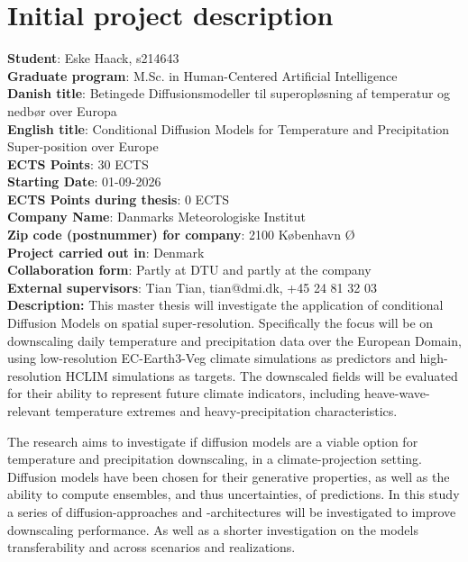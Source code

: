 \section*{Initial project description}

\textbf{Student}: Eske Haack, s214643 \\
\textbf{Graduate program}: M.Sc. in Human-Centered Artificial Intelligence \\
\textbf{Danish title}: Betingede Diffusionsmodeller til superopløsning af temperatur og nedbør over Europa \\
\textbf{English title}: Conditional Diffusion Models for Temperature and Precipitation Super-position over Europe \\
\textbf{ECTS Points}: 30 ECTS \\
\textbf{Starting Date}: 01-09-2026 \\
\textbf{ECTS Points during thesis}: 0 ECTS \\
\textbf{Company Name}: Danmarks Meteorologiske Institut \\
\textbf{Zip code (postnummer) for company}: 2100 København Ø \\
\textbf{Project carried out in}: Denmark \\
\textbf{Collaboration form}: Partly at DTU and partly at the company \\
\textbf{External supervisors}: Tian Tian, tian@dmi.dk, +45 24 81 32 03 \\
\textbf{Description: } This master thesis will investigate the application of conditional Diffusion Models on spatial super-resolution. Specifically the focus will be on downscaling daily temperature and precipitation data over the European Domain, using low-resolution EC-Earth3-Veg climate simulations as predictors and high-resolution HCLIM simulations as targets. The downscaled fields will be evaluated for their ability to represent future climate indicators, including heave-wave-relevant temperature extremes and heavy-precipitation characteristics.

The research aims to investigate if diffusion models are a viable option for temperature and precipitation downscaling, in a climate-projection setting. Diffusion models have been chosen for their generative properties, as well as the ability to compute ensembles, and thus uncertainties, of predictions.
In this study a series of diffusion-approaches and -architectures will be investigated to improve downscaling performance. As well as a shorter investigation on the models transferability and across scenarios and realizations. 